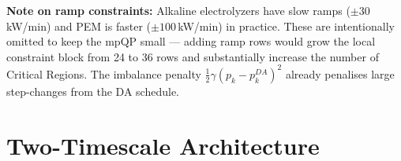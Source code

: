\documentclass[11pt, letterpaper]{article}
\begin{document}
\textbf{Note on ramp constraints:} Alkaline electrolyzers have slow ramps ($\pm30$\,kW/min) and PEM is faster ($\pm100$\,kW/min) in practice.  These are intentionally omitted to keep the mpQP small — adding ramp rows would grow the local constraint block from 24 to 36 rows and substantially increase the number of Critical Regions.  The imbalance penalty $\tfrac{1}{2}\gamma(p_k - p^{DA}_k)^2$ already penalises large step-changes from the DA schedule.

\newpage

\section{Two-Timescale Architecture}
\end{document}
